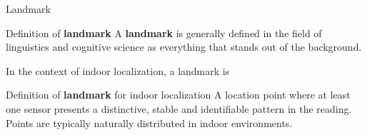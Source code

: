 




\begin{frame}{Landmark}
    \begin{block}{Definition of \textbf{landmark}}
        A \textbf{landmark} is generally defined in the field of linguistics and cognitive science as everything that stands out of the background.
    \end{block}

    In the context of indoor localization, a landmark is 
    \begin{block}{Definition of \textbf{landmark} for indoor localization}
        A location point where at least one sensor presents a distinctive, stable  and identifiable pattern in the reading. Points are typically naturally distributed in indoor environments.
    \end{block}
\end{frame}


